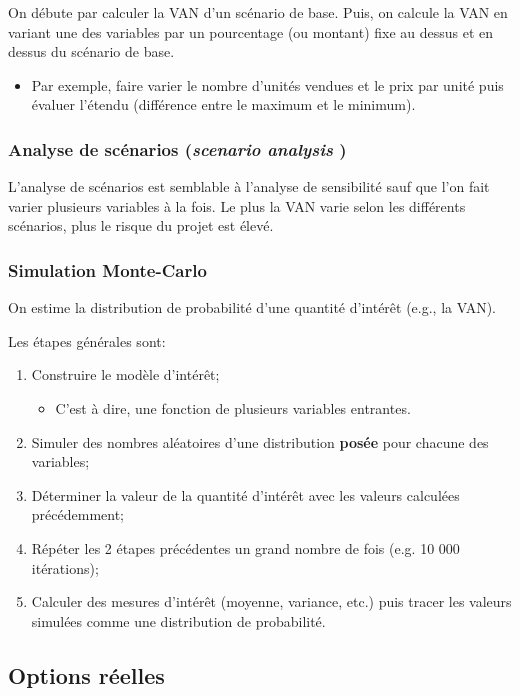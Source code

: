 \documentclass[10pt, french]{article}
\begin{document}
\begin{multicols*}{2}
On débute par calculer la VAN d'un scénario de base. Puis, on calcule la VAN en variant une des variables par un pourcentage (ou montant) fixe au dessus et en dessus du scénario de base. 
\begin{itemize}
	\item	Par exemple, faire varier le nombre d'unités vendues et le prix par unité puis évaluer l'étendu (différence entre le maximum et le minimum).
\end{itemize}


\subsubsection{Analyse de scénarios (\og \textit{scenario analysis} \fg{})}
L'analyse de scénarios est semblable à l'analyse de sensibilité sauf que l'on fait varier plusieurs variables à la fois. Le plus la VAN varie selon les différents scénarios, plus le risque du projet est élevé.


\subsubsection{Simulation Monte-Carlo}
On estime la distribution de probabilité d'une quantité d'intérêt (e.g., la VAN).

Les étapes générales sont:
\begin{enumerate}[leftmargin = *]
	\item	Construire le modèle d'intérêt;
		\begin{itemize}
		\item	C'est à dire, une fonction de plusieurs variables entrantes.
		\end{itemize}
	\item	Simuler des nombres aléatoires d'une distribution \textbf{posée} pour chacune des variables;
	\item	Déterminer la valeur de la quantité d'intérêt avec les valeurs calculées précédemment;
	\item	Répéter les 2 étapes précédentes un grand nombre de fois (e.g. 10 000 itérations);
	\item	Calculer des mesures d'intérêt (moyenne, variance, etc.) puis tracer les valeurs simulées comme une distribution de probabilité.
\end{enumerate}


\columnbreak
\subsection{Options réelles}


\end{multicols*}
\end{document}

